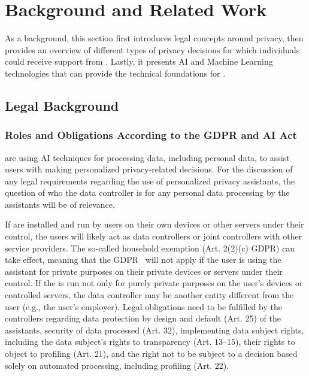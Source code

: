 \section{Background and Related Work}
\label{sec:background}
As a background, this section first introduces legal concepts around privacy, then provides an overview of different types of privacy decisions for which individuals could receive support from \PPAs. 
Lastly, it presents AI and Machine Learning technologies that can provide the technical foundations for \PPAs.

\subsection{Legal Background} 
\label{subsec:legal}

\subsubsection{Roles and Obligations According to the GDPR and AI Act}
\label{legal_background}
\PPAs are using AI techniques for processing data, including personal data, to assist users with making personalized privacy-related decisions. 
For the discussion of any legal requirements regarding the use of personalized privacy assistants, the question of who the data controller is for any personal data processing by the assistants will be of relevance.

If \PPAs are installed and run by users on their own devices or other servers under their control, the users will likely act as data controllers or joint controllers with other service providers. The so-called household exemption (Art. 2(2)(c) GDPR) can take effect, meaning that the GDPR~\cite{european_parliament_general_2016} will not apply if the user is using the assistant for private purposes on their private devices or servers under their control.
If the \PPA is run not only for purely private purposes on the user's devices or controlled servers, the data controller may be another entity different from the user (e.g., the user's employer). Legal obligations need to be fulfilled by the controllers regarding data protection by design and default (Art. 25) of the assistants, security of data processed (Art. 32), implementing data subject rights, including the data subject's rights to transparency (Art. 13--15), their rights to object to profiling (Art. 21), and the right not to be subject to a decision based solely on automated processing, including profiling (Art. 22).

